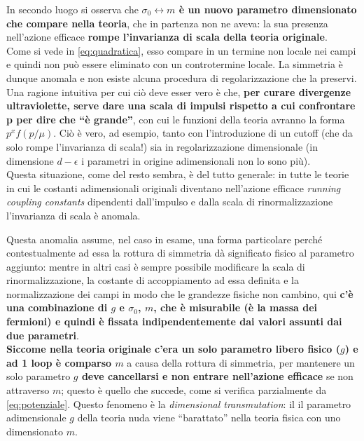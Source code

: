 \documentclass[a4paper,11pt]{amsart}
\newcommand{\nl}{\vskip 0.3cm}
\begin{document}
In secondo luogo si osserva che \textbf{$\sigma_0 \leftrightarrow m$ è un nuovo parametro dimensionato che compare nella teoria}, che in partenza non ne aveva: la sua presenza
nell'azione efficace \textbf{rompe l'invarianza di scala della teoria originale}.\\
Come si vede in \ref{eq:quadratica}, esso compare in un termine non locale nei campi e quindi non può essere eliminato con un controtermine locale. La simmetria è dunque anomala e non esiste alcuna procedura di regolarizzazione che la preservi. Una ragione intuitiva per cui ciò deve esser vero è che, \textbf{per curare divergenze ultraviolette, serve 
dare una scala di impulsi rispetto a cui confrontare p per dire che ``è grande''}, con cui le funzioni della teoria avranno la forma $p^xf(p/\mu)$. Ciò è vero, ad esempio, tanto 
con l'introduzione di un cutoff (che da solo rompe l'invarianza di scala!) sia in regolarizzazione dimensionale (in dimensione $d-\epsilon$ i parametri in origine 
adimensionali non lo sono più).\\
Questa situazione, come del resto sembra, è del tutto generale: in tutte le teorie in cui le costanti adimensionali originali diventano nell'azione efficace \emph{running coupling constants} dipendenti dall'impulso e dalla scala di rinormalizzazione l'invarianza di scala è anomala.
\nl

Questa anomalia assume, nel caso in esame, una forma particolare perché contestualmente ad essa la rottura di simmetria dà significato fisico al parametro aggiunto: mentre in altri casi è sempre possibile modificare la scala di rinormalizzazione, la costante di accoppiamento ad essa definita e la normalizzazione dei campi in modo che le grandezze fisiche non cambino, qui \textbf{c'è una combinazione di $g$ e $\sigma_0$, $m$, che è misurabile (è la massa dei fermioni) e quindi è fissata indipendentemente dai valori assunti dai due parametri}.\\
\textbf{Siccome nella teoria originale c'era un solo parametro libero fisico ($g$) e ad 1 loop è comparso $m$} a causa della rottura di simmetria, per mantenere un solo parametro \textbf{$g$ deve cancellarsi e non entrare nell'azione efficace} se non attraverso $m$; questo è quello che succede, come si verifica parzialmente da \ref{eq:potenziale}. Questo fenomeno è la \emph{dimensional transmutation}: il il parametro adimensionale $g$ della teoria nuda viene ``barattato'' nella teoria fisica con uno dimensionato $m$.
\nl
\end{document}
